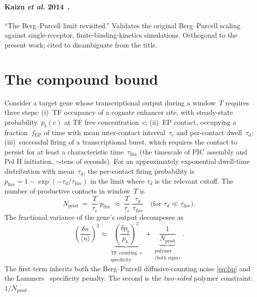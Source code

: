 \documentclass[11pt]{article}
\newcommand{\EP}{\mathrm{EP}}
\begin{document}
\paragraph{Kaizu \textit{et al.} 2014~\cite{Kaizu2014}.} ``The Berg--Purcell
limit revisited.'' Validates the original Berg--Purcell scaling against
single-receptor, finite-binding-kinetics simulations. Orthogonal to the
present work; cited to disambiguate from the title.

\section{The compound bound}
\label{sec:bound}

Consider a target gene whose transcriptional output during a window~$T$
requires three steps: (i)~TF occupancy of a cognate enhancer site, with
steady-state probability~$p_b(c)$ at TF free concentration~$c$; (ii)~EP
contact, occupying a fraction~$f_{\EP}$ of time with mean inter-contact
interval~$\tau_c$ and per-contact dwell~$\tau_d$; (iii)~successful firing
of a transcriptional burst, which requires the contact to persist for at
least a characteristic time~$\tau_{\mathrm{fire}}$ (the timescale of PIC
assembly and Pol II initiation, $\sim$tens of seconds). For an
approximately exponential dwell-time distribution with mean~$\tau_d$, the
per-contact firing probability is $p_{\mathrm{fire}} = 1 -
\exp(-\tau_d/\tau_{\mathrm{fire}})$ in the limit where $\tau_d$ is the
relevant cutoff. The number of productive contacts in window~$T$ is
\begin{equation}
  N_{\mathrm{prod}} \;=\; \frac{T}{\tau_c}\;p_{\mathrm{fire}}
  \;\approx\;
  \frac{T}{\tau_c}\;\frac{\tau_d}{\tau_{\mathrm{fire}}}
  \quad\text{(for }\tau_d \ll \tau_{\mathrm{fire}}\text{).}
  \label{eq:Nprod}
\end{equation}
The fractional variance of the gene's output decomposes as
\begin{equation}
  \left(\frac{\delta n}{\langle n\rangle}\right)^{\!2}
  \approx
  \underbrace{\left(\frac{\delta p_b}{p_b}\right)^{\!2}}_{\substack{\text{TF counting +}\\\text{specificity}}}
  +
  \underbrace{\frac{1}{N_{\mathrm{prod}}}}_{\substack{\text{polymer}\\\text{(both signs)}}}.
  \label{eq:decomp}
\end{equation}
The first term inherits both the Berg--Purcell diffusive-counting noise
\eqref{eq:bp} and the Lammers~\cite{Lammers2023} specificity penalty. The
second is the \emph{two-sided} polymer constraint: $1/N_{\mathrm{prod}}$
\end{document}
